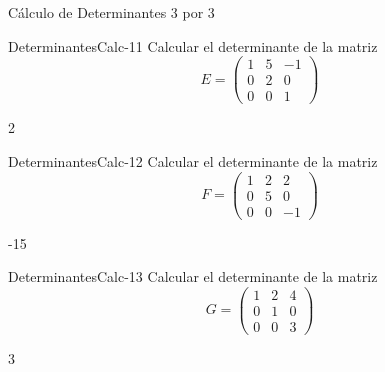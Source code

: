 \documentclass[a4,11pt]{aleph-notas}
\begin{document}
\begin{quiz}{Cálculo de Determinantes 3 por 3}
\begin{numerical}[tolerance=0]%
    {DeterminantesCalc-11}
    Calcular el determinante de la matriz
    \[
        E = \begin{pmatrix}
            1 & 5 & -1\\
            0 & 2 & 0\\
            0 & 0 & 1
        \end{pmatrix}
    \]
    \item 2
\end{numerical}

\begin{numerical}[tolerance=0]%
    {DeterminantesCalc-12}
    Calcular el determinante de la matriz
    \[
        F = \begin{pmatrix}
            1 & 2 & 2\\
            0 & 5 & 0\\
            0 & 0 & -1
        \end{pmatrix}
    \]
    \item -15
\end{numerical}

\begin{numerical}[tolerance=0]%
    {DeterminantesCalc-13}
    Calcular el determinante de la matriz
    \[
        G = \begin{pmatrix}
            1 & 2 & 4\\
            0 & 1 & 0\\
            0 & 0 & 3
        \end{pmatrix}
    \]
    \item 3
\end{numerical}

\end{quiz}
\end{document}
